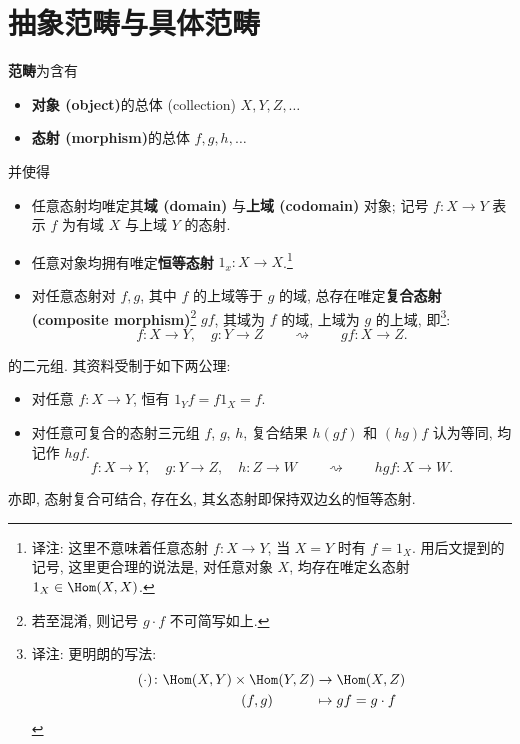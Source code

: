 \section{抽象范畴与具体范畴}
\begin{definition}\label{Def:Category}
    \textbf{范畴}为含有
        \begin{itemize}
            \item \textbf{对象 (object)}的总体 (collection) \(X,Y,Z,\dots\)
            \item \textbf{态射 (morphism)}的总体 \(f,g,h,\dots\)
        \end{itemize}
    并使得
        \begin{itemize}
            \item 任意态射均唯定其\textbf{域 (domain)} 与\textbf{上域 (codomain)} 对象; 记号 \(f\colon X\to Y\) 表示 \(f\) 为有域 \(X\) 与上域 \(Y\) 的态射.
            \item 任意对象均拥有唯定\textbf{恒等态射} \(1_x\colon X\to X\).\footnote{译注: 这里不意味着任意态射 \(f\colon X\to Y\), 当 \(X=Y\) 时有 \(f=1_X\). 用后文提到的记号, 这里更合理的说法是, 对任意对象 \(X\), 均存在唯定幺态射 \(1_X\in\Hom(X,X)\).}
            \item 对任意态射对 \(f,g\), 其中 \(f\) 的上域等于 \(g\) 的域, 总存在唯定\textbf{复合态射 (composite morphism)}\footnote{若至混淆, 则记号 \(g\cdot f\) 不可简写如上.} \(gf\), 其域为 \(f\) 的域, 上域为 \(g\) 的上域, 即\footnote{译注: 更明朗的写法:\begin{align*}(\cdot)\colon\Hom(X,Y)\times\Hom(Y,Z) & \to \Hom(X,Z)\\(f,g)\kern3em&\mapsto gf=g\cdot f\end{align*}}:\[
                f\colon X\to Y,\quad g\colon Y\to Z\qquad\rightsquigarrow\qquad gf\colon X\to Z.\]
        \end{itemize}
    的二元组. 其资料受制于如下两公理:
        \begin{itemize}
            \item 对任意 \(f\colon X\to Y\), 恒有 \(1_Yf=f1_X=f\).
            \item 对任意可复合的态射三元组 \(f\), \(g\), \(h\), 复合结果 \(h(gf)\) 和 \((hg)f\) 认为等同, 均记作 \(hgf\).\[
                    f\colon X\to Y,\quad g\colon Y\to Z,\quad h\colon Z\to W\qquad\rightsquigarrow\qquad hgf\colon X\to W.
                \]
        \end{itemize}
    亦即, 态射复合可结合, 存在幺, 其幺态射即保持双边幺的恒等态射.
\end{definition}
